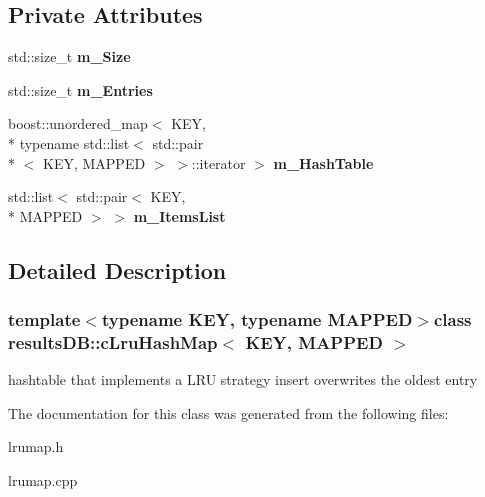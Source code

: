 \subsection*{Private Attributes}
\begin{DoxyCompactItemize}
\item 
\hypertarget{classresultsDB_1_1cLruHashMap_ab2d2befb97adb02f08257dea126f47ea}{std\-::size\-\_\-t {\bfseries m\-\_\-\-Size}}\label{classresultsDB_1_1cLruHashMap_ab2d2befb97adb02f08257dea126f47ea}

\item 
\hypertarget{classresultsDB_1_1cLruHashMap_a5f15d6ae1f4312e24fc2cad11d0435df}{std\-::size\-\_\-t {\bfseries m\-\_\-\-Entries}}\label{classresultsDB_1_1cLruHashMap_a5f15d6ae1f4312e24fc2cad11d0435df}

\item 
\hypertarget{classresultsDB_1_1cLruHashMap_afcbba62846fc3c7b167fe0abb529dd1a}{boost\-::unordered\-\_\-map$<$ K\-E\-Y, \\*
typename std\-::list$<$ std\-::pair\\*
$<$ K\-E\-Y, M\-A\-P\-P\-E\-D $>$ $>$\-::iterator $>$ {\bfseries m\-\_\-\-Hash\-Table}}\label{classresultsDB_1_1cLruHashMap_afcbba62846fc3c7b167fe0abb529dd1a}

\item 
\hypertarget{classresultsDB_1_1cLruHashMap_ae9194470ecb43ca81b246ee1360e9d59}{std\-::list$<$ std\-::pair$<$ K\-E\-Y, \\*
M\-A\-P\-P\-E\-D $>$ $>$ {\bfseries m\-\_\-\-Items\-List}}\label{classresultsDB_1_1cLruHashMap_ae9194470ecb43ca81b246ee1360e9d59}

\end{DoxyCompactItemize}


\subsection{Detailed Description}
\subsubsection*{template$<$typename K\-E\-Y, typename M\-A\-P\-P\-E\-D$>$class results\-D\-B\-::c\-Lru\-Hash\-Map$<$ K\-E\-Y, M\-A\-P\-P\-E\-D $>$}

hashtable that implements a L\-R\-U strategy insert overwrites the oldest entry 

The documentation for this class was generated from the following files\-:\begin{DoxyCompactItemize}
\item 
lrumap.\-h\item 
lrumap.\-cpp\end{DoxyCompactItemize}
